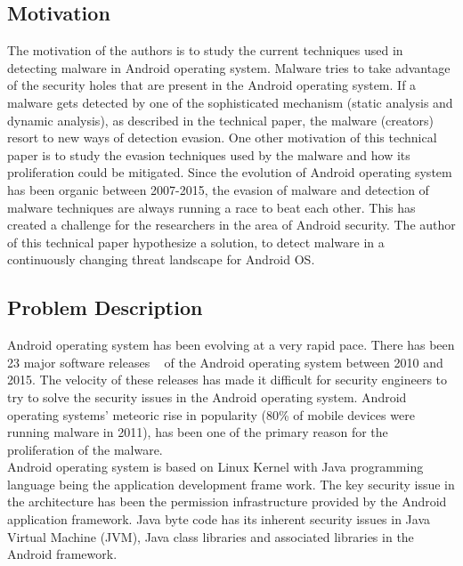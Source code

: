 \documentclass[12pt]{article}
\begin{document}
\subsection{Motivation}\label{ref:paper_motivation}
The motivation of the authors is to study the current techniques used in detecting malware in Android operating system. Malware tries to take advantage of the security holes that are present in the Android operating system. If a malware gets detected by one of the sophisticated mechanism (static analysis and dynamic analysis), as described in the technical paper, the malware (creators) resort to new ways of detection evasion. One other motivation of this technical paper is to study the evasion techniques used by the malware and how its proliferation could be mitigated. Since the evolution of Android operating system has been organic between 2007-2015, the evasion of malware and detection of malware techniques are always running a race to beat each other. This has created a challenge for the researchers in the area of Android security. The author of this technical paper hypothesize a solution, to detect malware in a continuously changing threat landscape for Android OS.

\subsection{Problem Description}\label{ref:paper_problem}
Android operating system has been evolving at a very rapid pace. There has been 23 major software releases ~\cite{Tam:2017:EAM:3022634.3017427} of the Android operating system between 2010 and 2015. The velocity of these releases has made it difficult for security engineers to try to solve the security issues in the Android operating system. Android operating systems' meteoric rise in popularity (80\% of mobile devices were running malware in 2011), has been one of the primary reason for the proliferation of the malware.\\
Android operating system is based on Linux Kernel with Java programming language being the application development frame work. The key security issue in the architecture has been the permission infrastructure provided by the Android application framework. Java byte code has its inherent security issues in Java Virtual Machine (JVM), Java class libraries and associated libraries in the Android framework.
\end{document}
